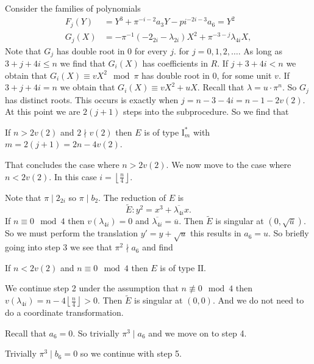 Consider the families of polynomials 
\begin{align*}
	F_j(Y) &= Y^3 + \pi^{-i-2} a_3 Y - pi^{-2i-3} a_6 = Y^2 \\
	G_j(X) &= -\pi^{-1}(-2_{2i} - \lambda_{2i}) X^2 + \pi^{-3 - j}\lambda_{4i} X
,\end{align*}
Note that $G_j$ has double root in $0$ for every $j$.  
for $j = 0, 1,2, \ldots$.
As long as $3 + j + 4i \le n$ we find that $G_i(X)$ has coefficients in $R$. 
If $j + 3 + 4i <  n$ we obtain that $G_i(X) \equiv v X^2 \mod \pi$ has double root in $0$, for some unit  $v$.
If $3 + j + 4i = n$ we obtain that $G_i(X) \equiv v X^2 + uX$. Recall that $\lambda = u \cdot \pi^{n}$. 
So $G_j$ has distinct roots. 
This occurs is exactly when $j = n - 3 - 4i = n - 1 - 2v(2)$. 
At this point we are $2(j + 1)$ steps into the subprocedure. 
So we find that 
\begin{tateconclusion}
	If $n > 2v(2)$ and $2\nmid v(2)$ then $E$ is of type $\mathrm I_m^*$ with  $m = 2(j + 1) = 2n - 4v(2)$.
\end{tateconclusion}


\medskip

That concludes the case where $n > 2v(2)$. 
We now move to the case where $n < 2v(2)$. 
In this case $i = \left\lfloor \frac{n}{4} \right\rfloor$.

Note that $\pi\mid 2_{2i}$ so $\pi\mid b_2$. 
The reduction of $E$ is 
\[
\tilde E: y^2 = x^3 +  \overline{\lambda_{4i}}x
.\] 
If $n \equiv 0 \mod 4$ then $v(\lambda_{4i}) = 0$ and $\overline{\lambda_{4i}} = \overline{u}$. 
Then $\tilde E$ is singular at $(0, \sqrt{\overline{u}})$. 
So we must perform the translation $y' = y + \sqrt{u} $ this results in $a_6 = u$. 
So briefly going into step $3$ we see that $\pi^2 \nmid a_6$ and find 
\begin{tateconclusion}
	If $n < 2v(2)$ and $n \equiv 0 \mod 4$ then $E$ is of type $\mathrm{II}$. 
\end{tateconclusion}

We continue step 2 under the assumption that $n \not\equiv 0 \mod 4$ then $v(\lambda_{4i}) = n - 4 \left\lfloor \frac{n}{4} \right\rfloor >  0$. 
Then $\tilde E$ is singular at $(0, 0)$. And we do not need to do a coordinate transformation. 



Recall that $a_6 = 0$. So trivially $\pi^3 \mid a_6$ and we move on to step 4.

Trivially $\pi^3 \mid b_6 = 0$ so we continue with step 5.

